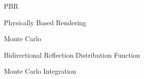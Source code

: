 \documentclass[cic,tc,english]{iiufrgs}
\begin{document}
\listoffigures


\begin{listofabbrv}{PBR}
    \item[PBR] Physically Based Rendering
    \item[MC] Monte Carlo
    \item[BRDF] Bidirectional Reflection Distribution Function
    \item[MCI] Monte Carlo Integration
\end{listofabbrv}


\tableofcontents













\end{document}
